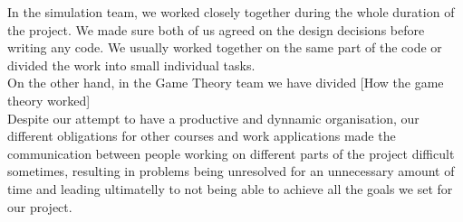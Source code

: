 \documentclass[10pt, a4paper]{report}
\begin{document}
In the simulation team, we worked closely together during the whole duration of the project. We made sure both of us agreed on the design decisions before writing any code. We usually worked together on the same part of the code or divided the work into small individual tasks. \\

On the other hand, in the Game Theory team we have divided
[How the game theory worked] \\

Despite our attempt to have a productive and dynnamic organisation, our different obligations for other courses and work applications made the communication between people working on different parts of the project difficult sometimes, resulting in problems being unresolved for an unnecessary amount of time and leading ultimatelly to not being able to achieve all the goals we set for our project. \\




\end{document}

